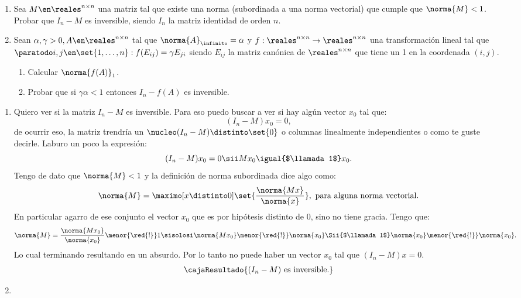 \begin{enunciado}{\ejExtra}
  \begin{enumerate}[label=(\alph*)]
    \item
          Sea $M \en \reales^{n \times n}$ una matriz tal que
          existe una norma (subordinada a una norma vectorial)
          que cumple que $\norma{M} < 1$. Probar que $I_n - M$ es inversible,
          siendo $I_n$ la matriz identidad de orden $n$.

    \item
          Sean $\alpha, \gamma > 0, A \en \reales^{n \times n}$ tal que
          $\norma{A}_\infinito = \alpha$ y $f : \reales^{n \times n} \to \reales^{n \times n}$
          una transformación lineal tal que
          $\paratodo i,j \en \set{1,\ldots, n} : f(E_{ij}) = \gamma E_{ji}$ siendo $E_{ij}$ la matriz canónica de
          $\reales^{n \times n}$ que tiene un 1 en la coordenada $(i, j)$.
          \begin{enumerate}[label=\roman*)]
            \item Calcular $\norma{f(A)}_1$.
            \item Probar que si $\gamma \alpha < 1$ entonces $I_n - f(A)$ es inversible.
          \end{enumerate}
  \end{enumerate}
\end{enunciado}

\begin{enumerate}[label=(\alph*)]
  \item Quiero ver si la matriz $I_n - M$ es inversible. Para eso puedo buscar a ver si hay algún vector $x_0$ tal que:
        $$
          (I_n - M)x_0 = 0,
        $$
        de ocurrir eso, la matriz trendría un $\nucleo(I_n - M) \distinto \set{0}$ o columnas linealmente independientes o como te guste decirle.
        Laburo un poco la expresión:
        $$
          (I_n - M)x_0 = 0
          \sii
          Mx_0 \igual{$\llamada1$} x_0.
        $$
        Tengo de dato que $\norma{M} < 1$ y la definición de norma subordinada dice algo como:
        $$
          \norma{M} = \maximo[x \distinto 0]\set{{\frac{\norma{Mx}}{\norma{x}}}}, \text{ para alguna norma vectorial}.
        $$
        En particular agarro de ese conjunto el vector $x_0$ que es por hipótesis distinto de 0, sino no tiene gracia. Tengo que:
        $$
          \norma{M} =
          \frac{\norma{Mx_0}}{\norma{x_0}} \menor{\red{!}}  1
          \sisolosi
          \norma{Mx_0} \menor{\red{!}} \norma{x_0}
          \Sii{$\llamada1$}
          \norma{x_0} \menor{\red{!}} \norma{x_0}.
        $$
        Lo cual terminando resultando en un absurdo. Por lo tanto no puede haber un vector $x_0$ tal que
        $(I_n - M) x = 0$.
        $$
          \cajaResultado{
            (I_n - M)  \text{ es inversible.}
          }
        $$
  \item \hacer
\end{enumerate}

\begin{aportes}
  \item {}
\end{aportes}
